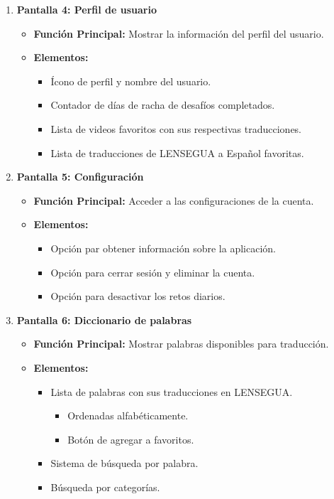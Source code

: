 \begin{enumerate}
    \item \textbf{Pantalla 4: Perfil de usuario}
    \begin{itemize}
        \item \textbf{Función Principal:} Mostrar la información del perfil del usuario.
        \item \textbf{Elementos:}
        \begin{itemize}
            \item Ícono de perfil y nombre del usuario.
            \item Contador de días de racha de desafíos completados.
            \item Lista de videos favoritos con sus respectivas traducciones.
            \item Lista de traducciones de LENSEGUA a Español favoritas. 
        \end{itemize}
    \end{itemize}

    \item \textbf{Pantalla 5: Configuración}
    \begin{itemize}
        \item \textbf{Función Principal:} Acceder a las configuraciones de la cuenta.
        \item \textbf{Elementos:}
        \begin{itemize}
            \item Opción par obtener información sobre la aplicación. 
            \item Opción para cerrar sesión y eliminar la cuenta.
            \item Opción para desactivar los retos diarios.
        \end{itemize}
    \end{itemize}

    \item \textbf{Pantalla 6: Diccionario de palabras}
    \begin{itemize}
        \item \textbf{Función Principal:} Mostrar palabras disponibles para traducción.
        \item \textbf{Elementos:}
        \begin{itemize}
            \item Lista de palabras con sus traducciones en LENSEGUA.
            \begin{itemize}
                \item Ordenadas alfabéticamente.
                \item Botón de agregar a favoritos.
            \end{itemize}
            \item Sistema de búsqueda por palabra.
            \item Búsqueda por categorías.
        \end{itemize}
    \end{itemize}


\end{enumerate}

